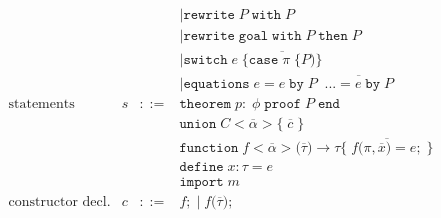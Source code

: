 \documentclass{article}
\newcommand{\LC}{\texttt{\{}}
\newcommand{\RC}{\texttt{\}}}
\newcommand{\LP}{\texttt{(}}
\newcommand{\RP}{\texttt{)}}
\begin{document}
\[\begin{array}{lrcl}
  & & & \mid \mathtt{rewrite}\; P \; \mathtt{with}\; P \\
  & & & \mid \mathtt{rewrite}\; \mathtt{goal} \; \mathtt{with}\; P \; \mathtt{then}\; P\\
  & & & \mid \mathtt{switch}\;e\; \LC \overline{\mathtt{case}\; \pi\; \LC P \RP} \RC \\
  & & & \mid \mathtt{equations}\; e \mathop{\texttt{=}} e \;\mathtt{by}\; P \;\; \overline{\mathtt{...} \mathop{\texttt{=}} e \; \mathtt{by}\; P} \\
  \text{statements} &s &::=& \mathtt{theorem}\; p\mathtt{:}\; \phi\; \mathtt{proof}\; P\;\mathtt{end} \\
  &&& \mathtt{union} \; C \mathtt{<} \overline{\alpha} \mathtt{>} \LC\; \overline{\mathit{c}}\;\RC  \\
  &&& \mathtt{function}\; f \mathtt{<} \overline{\alpha}\mathtt{>} \LP \overline{\tau} \RP{\to}\tau \LC\; \overline{f\LP\pi, \overline{x} \RP \mathop{\texttt{=}} e \mathtt{;}} \;\RC \\
  &&& \mathtt{define}\; x \mathop{\texttt{:}} \tau \; \texttt{=} \; e \\
  &&& \mathtt{import}\; m \\
  \text{constructor decl.} & c & ::= & f \mathtt{;} \mid f \LP \overline{\tau} \RP \mathtt{;}
\end{array}
\]
\end{document}
